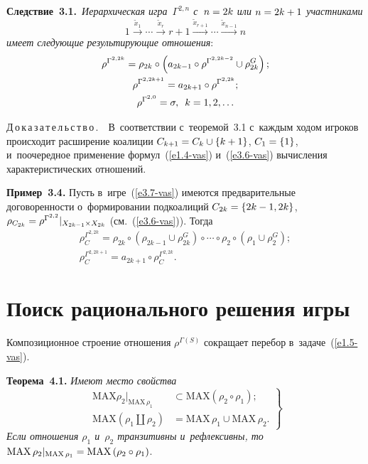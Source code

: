 \begin{multicols}{2}
\smallskip

\noindent
\textbf{Следствие~3.1.}\ \textit{Иерархическая игра~$\Gamma^{2,n}$ с~$n\hm= 2k$ 
или $n\hm=2k\hm+ 1$ участ\-ни\-ками}
\begin{equation}
\boxed{1} \overset{\tilde{x}_1}{\to} \cdots \overset{\tilde{x}_r}{\to} 
\boxed{r+1}\overset{\tilde{x}_{r+1}}{\to} \cdots \overset{\tilde{x}_{n-1}}{\to} \boxed{n}
\label{e3.7-vas}
\end{equation} 
\textit{имеет следующие ре\-зуль\-ти\-ру\-ющие отношения}:
\begin{multline}
\rho^{\Gamma^{2,2k}} =\rho_{2k}\circ \left( a_{2k-1}\circ \rho^{\Gamma^{2,2k-2}} 
\cup \rho_{2k}^G\right);\\
\rho^{\Gamma^{2,2k+1}} = a_{2k+1}\circ \rho^{\Gamma^{2,2k}};\\
\rho^{\Gamma^{2,0}} =\sigma,\enskip k=1,2,\ldots
\label{e3.8-vas}
\end{multline}
    
    \noindent
    Д\,о\,к\,а\,з\,а\,т\,е\,л\,ь\,с\,т\,в\,о\,.\ \ В~со\-от\-вет\-ст\-вии с~тео\-ре\-мой~3.1 
с~каж\-дым ходом игроков происходит расширение коалиции $C_{k+1}\hm= C_k \cup 
\{k+1\}$, $C_1\hm= \{1\}$, и~поочередное применение формул~(\ref{e1.4-vas}) 
и~(\ref{e3.6-vas}) вы\-чис\-ле\-ния характеристических отношений. 
    
    \textbf{Пример~3.4.} Пусть в~игре~(\ref{e3.7-vas}) имеются предварительные 
договоренности о~формировании подкоалиций $C_{2k} \hm= \{2k-1,2k\}$, 
$\rho_{C_{2k}} \hm= \rho^{\Gamma^{2,2}}\vert_{X_{2k-1}\times X_{2k}}$ 
(см.~(\ref{e3.6-vas})). Тогда 
    \begin{multline*}
    \rho_C^{\Gamma^{2,2k}} =\rho_{2k} \circ\left( \rho_{2k-1} \cup \rho^G_{2k} 
\right)\circ\cdots\circ \rho_2 \circ\left( \rho_1\cup \rho_2^G\right);\\
    \rho_C^{\Gamma^{2,2k+1}} =a_{2k+1}\circ \rho_C^{\Gamma^{2,2k}}.
  \end{multline*}

\section{Поиск рационального решения игры}

    Композиционное строение отношения $\rho^{\Gamma(S)}$ со\-кра\-ща\-ет перебор 
в~задаче~(\ref{e1.5-vas}). 
    
    \smallskip
    
    \noindent
    \textbf{Теорема~4.1.} \textit{Имеют мес\-то свойства}
    \begin{equation}
    \left.
    \begin{array}{rl}
    \mathrm{MAX}\rho_2\vert_{\mathrm{MAX}\,\rho_1} &\subset \mathrm{MAX} \left(\rho_2\circ\rho_1\right);\\[6pt]
    \mathrm{MAX}\left(\rho_1\coprod\rho_2\right) &=\mathrm{MAX}\,\rho_1\cup \mathrm{MAX}\, \rho_2.
    \end{array}
    \right\}
    \label{e4.1-vas}
    \end{equation}
 \textit{Если отношения $\rho_1$ и~$\rho_2$ транзитивны и~рефлексивны, то} 
 $\mathrm{MAX}\,\rho_2\vert_{\mathrm{MAX}\,\rho_1} \hm= \mathrm{MAX} \left(\rho_2\circ\rho_1\right)$.
 

\end{multicols}
